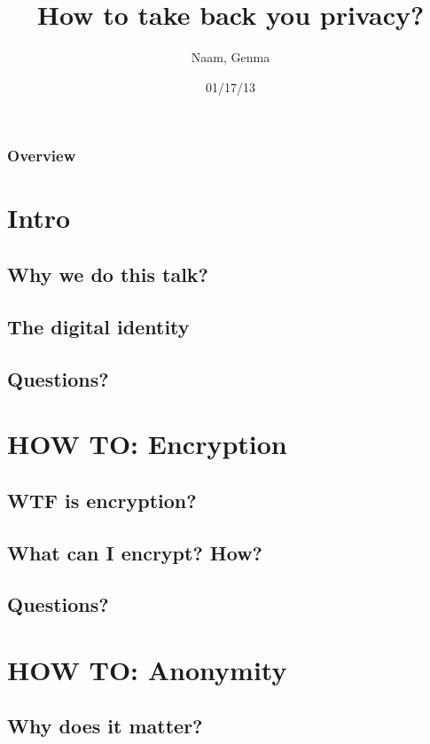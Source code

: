 \documentclass{beamer}
\title[Anonymity and encryption]{How to take back you privacy?}
\author{Naam, Genma}
\institute[@Gconfs]{
EPITA / Gconfs\\
\textit{naam@riseup.net\\ genma@riseup.net}
}
\date{01/17/13}
\begin{document}
\begin{frame}
\titlepage
\end{frame}
\begin{frame}
\frametitle{Overview}
\tableofcontents
\end{frame}


\section{Intro}
\subsection{Why we do this talk?}  
\subsection{The digital identity}
\subsection{Questions?}


\section{HOW TO: Encryption}
\subsection{WTF is encryption?}
\subsection{What can I encrypt? How?}
\subsection{Questions?}


\section{HOW TO: Anonymity}
\subsection{Why does it matter?}
\end{document}
